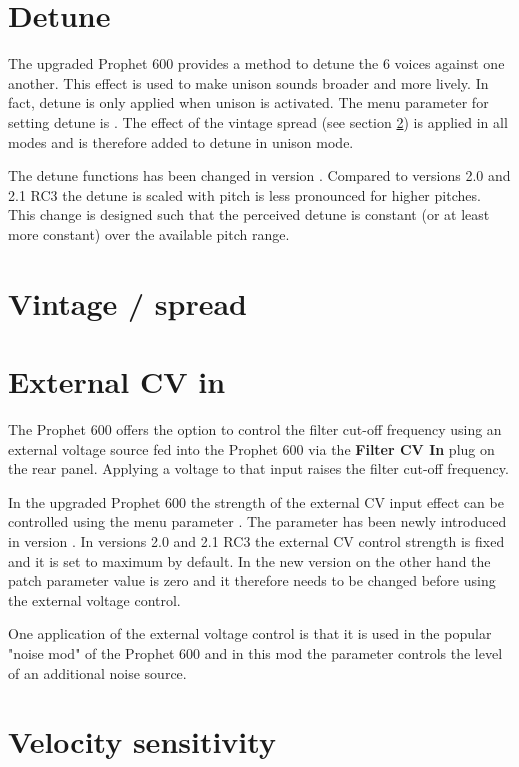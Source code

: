 \documentclass[landscape, 11pt, oneside]{report}
\newenvironment{flowtext}{\addmargin[0cm]{7cm}}{\endaddmargin} %
\begin{document}
\begin{flowtext}
\section{Detune}\label{detune}

The upgraded Prophet 600 provides a method to detune the 6 voices against one another. This effect is used to make unison sounds broader and more lively. In fact, detune is only applied when unison is activated. The menu parameter for setting detune is \detune. The effect of the vintage spread (see section \ref{spreadsett}) is applied in all modes and is therefore added to detune in unison mode. 

The detune functions has been changed in version \version. Compared to versions 2.0 and 2.1 RC3 the detune is scaled with pitch is less pronounced for higher pitches. This change is designed such that the perceived detune is constant (or at least more constant) over the available pitch range. 

\section{Vintage / spread}\label{spreadsett}



\section{External CV in}\label{extcv}

The Prophet 600 offers the option to control the filter cut-off frequency using an external voltage source fed into the Prophet 600 via the \textbf{Filter CV In} plug on the rear panel. Applying a voltage to that input raises the filter cut-off frequency.

In the upgraded Prophet 600 the strength of the external CV input effect can be controlled using the menu parameter \extvolt. The parameter has been newly introduced in version \version. In versions 2.0 and 2.1 RC3 the external CV control strength is fixed and it is set to maximum by default. In the new version on the other hand the patch parameter value is zero and it therefore needs to be changed before using the external voltage control. 

One application of the external voltage control is that it is used in the popular "noise mod" of the Prophet 600 and in this mod the parameter controls the level of an additional noise source. 

\section{Velocity sensitivity}\label{velocity}


\end{flowtext}
\end{document}
